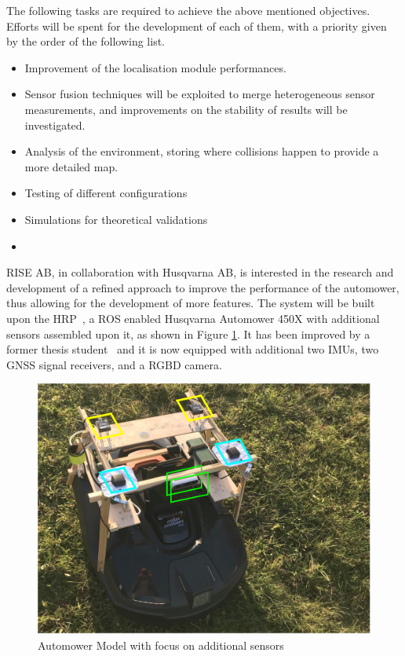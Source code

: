 \noindent The following tasks are required to achieve the above mentioned objectives. Efforts will be spent for the development of each of them, with a priority given by the order of the following list. 
\begin{itemize}
    \item Improvement of the localisation module performances.%
    \item Sensor fusion techniques will be exploited to merge heterogeneous sensor measurements, and improvements on the stability of results will be investigated.
    \item Analysis of the environment, storing where collisions happen to provide a more detailed map.
    \item Testing of different configurations
    \item Simulations for theoretical validations
    \item
\end{itemize}

RISE AB, in collaboration with Husqvarna AB, is interested in the research and development of a refined approach to improve the performance of the automower, thus allowing for the development of more features.
The system will be built upon the \Gls{HRP}~\cite{HRP}, a \Gls{ROS} enabled Husqvarna Automower 450X with additional sensors assembled upon it, as shown in Figure \ref{fig:HardwareSetup}. It has been improved by a former thesis student~\cite{HRPTianze} and it is now equipped with additional two \Glspl{IMU}, two \Gls{GNSS} signal receivers, and a \Gls{RGBD} camera.


\begin{figure}[!ht]   
  \begin{center}
    \includegraphics[width=1.0\textwidth]{Images/1-Introduction/projectTheme.pdf}
  \caption{Automower Model with focus on additional sensors}\label{fig:HardwareSetup}
  \end{center}
\end{figure}

